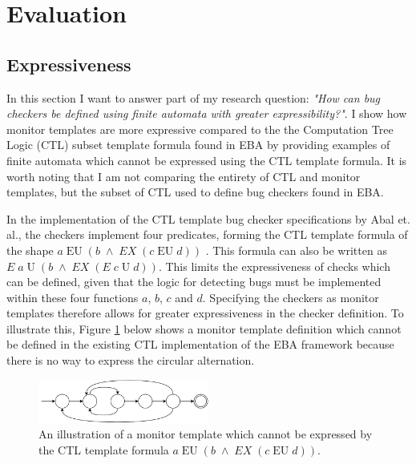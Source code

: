 \section{Evaluation}

\subsection{Expressiveness}

In this section I want to answer part of my research question: \textit{"How can bug checkers be defined using finite automata with greater expressibility?"}. I show how monitor templates are more expressive compared to the the Computation Tree Logic (CTL) subset template formula found in EBA by providing examples of finite automata which cannot be expressed using the CTL template formula. It is worth noting that I am not comparing the entirety of CTL and monitor templates, but the subset of CTL used to define bug checkers found in EBA. 

In the implementation of the CTL template bug checker specifications by Abal et. al., the checkers implement four predicates, forming the CTL template formula of the shape $a\;\text{EU}\;(b\;\land\;EX\;(c\;\text{EU}\;d))$ \cite{Abal2017EffectiveBF}\cite{research-project}. This formula can also be written as $E\;a\;\text{U}\;(b\;\land\;EX\;(E\;c\;\text{U}\;d))$. This limits the expressiveness of checks which can be defined, given that the logic for detecting bugs must be implemented within these four functions $a$, $b$, $c$ and $d$. Specifying the checkers as monitor templates therefore allows for greater expressiveness in the checker definition. To illustrate this, Figure \ref{expressive-monitor} below shows a monitor template definition which cannot be defined in the existing CTL implementation of the EBA framework because there is no way to express the circular alternation.

\begin{figure}[H]
    \centering
    \includegraphics[width=0.5\textwidth]{evaluation/figures/monitor}
    \caption{An illustration of a monitor template which cannot be expressed by the CTL template formula $a\;\text{EU}\;(b\;\land\;EX\;(c\;\text{EU}\;d))$.}
    \label{expressive-monitor}
\end{figure}

